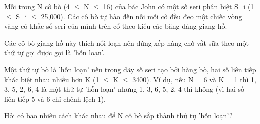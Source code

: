 Mỗi trong N cô bò (4  $\le$  N  $\le$  16) của bác John có một số seri phân biệt S\_i (1  $\le$  S\_i  $\le$  25,000). Các cô bò tự hào đến nỗi mỗi cô đều đeo một chiếc vòng vàng có khắc số seri của mình trên cổ theo kiểu các băng đảng giang hồ.  

   Các cô bò giang hồ này thích nổi loạn nên đứng xếp hàng chờ vắt sữa theo một thứ tự gọi được gọi là 'hỗn loạn'.  

   Một thứ tự bò là 'hỗn loạn' nếu trong dãy số seri tạo bởi hàng bò, hai số liên tiếp khác biệt nhau nhiều hơn K (1  $\le$  K  $\le$  3400). Ví dụ, nếu N = 6 và K = 1 thì 1, 3, 5, 2, 6, 4 là một thứ tự 'hỗn loạn' nhưng 1, 3, 6, 5, 2, 4 thì không (vì hai số liên tiếp 5 và 6 chỉ chênh lệch 1).  

   Hỏi có bao nhiêu cách khác nhau để N cô bò sắp thành thứ tự 'hỗn loạn'?